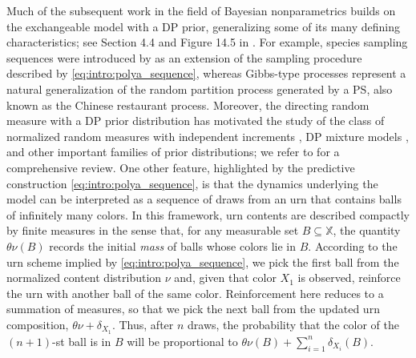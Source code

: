 \documentclass[a4paper]{article}
\theoremstyle{plain}
\theoremstyle{remark}
\theoremstyle{definition}
\begin{document}
Much of the subsequent work in the field of Bayesian nonparametrics builds on the exchangeable model with a DP prior, generalizing some of its many defining characteristics; see Section 4.4 and Figure 14.5 in \cite{ghosal2017}. For example, species sampling sequences were introduced by \cite{pitman1996} as an extension of the sampling procedure described by \eqref{eq:intro:polya_sequence}, whereas Gibbs-type processes \citep{lijoi2007,deblasi2015} represent a natural generalization of the random partition process generated by a PS, also known as the Chinese restaurant process. Moreover, the directing random measure with a DP prior distribution has motivated the study of the class of normalized random measures with independent increments \citep{regazzini2003}, DP mixture models \citep{lo1984}, and other important families of prior distributions; we refer to \cite{lijoi2010} for a comprehensive review. One other feature, highlighted by the predictive construction \eqref{eq:intro:polya_sequence}, is that the dynamics underlying the model can be interpreted as a sequence of draws from an urn that contains balls of infinitely many colors. In this framework, urn contents are described compactly by finite measures in the sense that, for any measurable set $B\subseteq\mathbb{X}$, the quantity $\theta\nu(B)$ records the initial \textit{mass} of balls whose colors lie in $B$. According to the urn scheme implied by \eqref{eq:intro:polya_sequence}, we pick the first ball from the normalized content distribution $\nu$ and, given that color $X_1$ is observed, reinforce the urn with another ball of the same color. Reinforcement here reduces to a summation of measures, so that we pick the next ball from the updated urn composition, $\theta\nu+\delta_{X_1}.$ Thus, after $n$ draws, the probability that the color of the $(n+1)$-st ball is in $B$ will be proportional to $\theta\nu(B)+\sum_{i=1}^{n}\delta_{X_i}(B)$.
\end{document}
